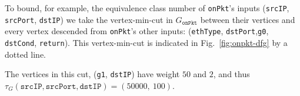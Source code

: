 
To bound, for example, the equivalence class number of \texttt{onPkt}'s inputs (\texttt{srcIP}, \texttt{srcPort}, \texttt{dstIP}) we take the vertex-min-cut in $G_\texttt{onPkt}$ between their vertices and every vertex descended from \texttt{onPkt}'s other inputs: (\texttt{ethType}, \texttt{dstPort},\texttt{g0}, \texttt{dstCond}, \texttt{return}). This vertex-min-cut is indicated in Fig.~\ref{fig:onpkt-dfg} by a dotted line.


The vertices in this cut, (\texttt{g1}, \texttt{dstIP}) have weight $50$ and $2$, and thus $\tau_G(\texttt{srcIP}, \texttt{srcPort}, \texttt{dstIP}) = (50000,\ 100)$.








